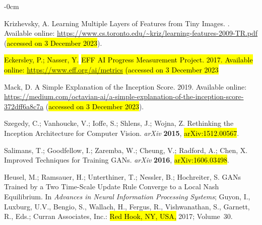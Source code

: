 \documentclass[technologies,article,accept,pdftex,moreauthors]{Definitions/mdpi}
\begin{document}
\begin{adjustwidth}{-\extralength}{0cm}
\begin{thebibliography}{999}


Krizhevsky, A.
\newblock Learning Multiple Layers of Features from Tiny Images.
. Available online: \url{https://www.cs.toronto.edu/~kriz/learning-features-2009-TR.pdf} (\hl{accessed on 3 December 2023}).

\hl{Eckersley, P.; Nasser, Y.}%
\newblock \hl{EFF AI Progress Measurement Project. 2017. Available online: \url{https://www.eff.org/ai/metrics} (accessed on 3 December 2023}%


Mack, D. A Simple Explanation of the Inception Score. 2019. Available online: \url{https://medium.com/octavian-ai/a-simple-explanation-of-the-inception-score-372dff6a8c7a} (\hl{accessed on 3 December 2023}).

Szegedy, C.; Vanhoucke, V.; Ioffe, S.; Shlens, J.; Wojna, Z.
\newblock Rethinking the Inception Architecture for Computer Vision.   \emph{arXiv} \textbf{2015},  \hl{arXiv:1512.00567}. 

Salimans, T.; Goodfellow, I.; Zaremba, W.; Cheung, V.; Radford, A.; Chen, X.
\newblock Improved Techniques for Training GANs. \emph{arXiv} \textbf{2016},  \hl{arXiv:1606.03498}. 

Heusel, M.; Ramsauer, H.; Unterthiner, T.; Nessler, B.; Hochreiter, S.
\newblock GANs Trained by a Two Time-Scale Update Rule Converge to a Local Nash
  Equilibrium. In \emph{Advances in Neural Information Processing
  Systems}; Guyon, I., Luxburg, U.V., Bengio, S., Wallach, H., Fergus, R.,
  Vishwanathan, S., Garnett, R., Eds.; Curran Associates, Inc.: \hl{Red Hook, NY, USA,} 2017; Volume~30.%


\end{thebibliography}
\end{adjustwidth}
\end{document}
